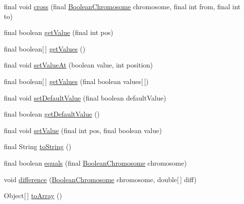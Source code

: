 \begin{DoxyCompactItemize}
\item 
final void \hyperlink{classjenes_1_1chromosome_1_1_boolean_chromosome_af31ce0ed4f82fccd837cfde93bc4ee61}{cross} (final \hyperlink{classjenes_1_1chromosome_1_1_boolean_chromosome}{Boolean\-Chromosome} chromosome, final int from, final int to)
\item 
final boolean \hyperlink{classjenes_1_1chromosome_1_1_boolean_chromosome_a6edb214f001732cfd6af9bbac3a23515}{get\-Value} (final int pos)
\item 
final boolean\mbox{[}$\,$\mbox{]} \hyperlink{classjenes_1_1chromosome_1_1_boolean_chromosome_a27db9ee77a97d896d0cdafc726681272}{get\-Values} ()
\item 
final void \hyperlink{classjenes_1_1chromosome_1_1_boolean_chromosome_a9bd35e276f2739f19fa7a695c85f415c}{set\-Value\-At} (boolean value, int position)
\item 
final boolean\mbox{[}$\,$\mbox{]} \hyperlink{classjenes_1_1chromosome_1_1_boolean_chromosome_aafccb6ebf217d02c0502e185b1972f82}{get\-Values} (final boolean values\mbox{[}$\,$\mbox{]})
\item 
final void \hyperlink{classjenes_1_1chromosome_1_1_boolean_chromosome_a3730cbcd4d048349f134593db820566d}{set\-Default\-Value} (final boolean default\-Value)
\item 
final boolean \hyperlink{classjenes_1_1chromosome_1_1_boolean_chromosome_a9b75f626b2b5fbc90215a53ac91d24a7}{get\-Default\-Value} ()
\item 
final void \hyperlink{classjenes_1_1chromosome_1_1_boolean_chromosome_ab37e05ed7a30e43b740f0c2d9c548e88}{set\-Value} (final int pos, final boolean value)
\item 
final String \hyperlink{classjenes_1_1chromosome_1_1_boolean_chromosome_a17ecce8325cc2ba6b1703551768c245f}{to\-String} ()
\item 
final boolean \hyperlink{classjenes_1_1chromosome_1_1_boolean_chromosome_a82b50fe50a7e8821ee3ae5cc96bca013}{equals} (final \hyperlink{classjenes_1_1chromosome_1_1_boolean_chromosome}{Boolean\-Chromosome} chromosome)
\item 
void \hyperlink{classjenes_1_1chromosome_1_1_boolean_chromosome_a0d602ca5a958ee2712963602d2f1eee9}{difference} (\hyperlink{classjenes_1_1chromosome_1_1_boolean_chromosome}{Boolean\-Chromosome} chromosome, double\mbox{[}$\,$\mbox{]} diff)
\item 
Object\mbox{[}$\,$\mbox{]} \hyperlink{classjenes_1_1chromosome_1_1_boolean_chromosome_a3ff06b819a640b0e89935d99cc69d3ac}{to\-Array} ()
\end{DoxyCompactItemize}


